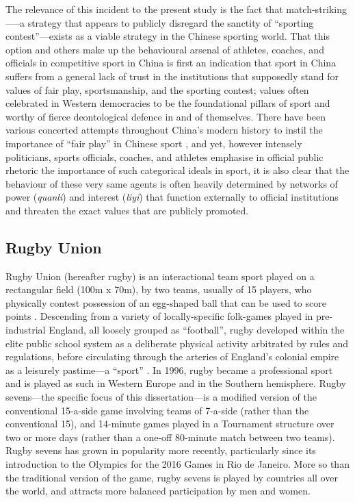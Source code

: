     The relevance of this incident to the present study is the fact that match-striking—--a strategy that appears to publicly disregard the sanctity of ``sporting contest''---exists as a viable strategy in the Chinese sporting world. That this option and others make up the behavioural arsenal of athletes, coaches, and officials in competitive sport in China is first an indication that sport in China suffers from a general lack of trust in the institutions that supposedly stand for values of fair play, sportsmanship, and the sporting contest; values often celebrated in Western democracies to be the foundational pillars of sport and worthy of fierce deontological defence in and of themselves\citep{Morris2004,Gold2002,Yuki2005}.
    There have been various concerted attempts throughout China's modern history to instil the importance of ``fair play'' in Chinese sport \citep{Morris2004,Brownell1995,Brownell2008}, and yet, however intensely politicians, sports officials, coaches, and athletes emphasise in official public rhetoric the importance of such categorical ideals in sport, it is also clear that the behaviour of these very same agents is often heavily determined by networks of power (\textit{quanli}) and interest (\textit{liyi}) that function externally to official institutions and threaten the exact values that are publicly promoted.












  \subsection{Rugby Union}


  Rugby Union (hereafter rugby) is an interactional team sport played on a rectangular field (100m x 70m), by two teams, usually of 15 players, who physically contest possession of an egg-shaped ball that can be used to score points \citep{IRB2014}.  Descending from a variety of locally-specific folk-games played in pre-industrial England, all loosely grouped as ``football'', rugby developed within the elite public school system as a deliberate physical activity arbitrated by rules and regulations, before circulating through the arteries of England's colonial empire as a leisurely pastime—a ``sport'' \citep{Dunning2005}.  In 1996, rugby became a professional sport and is played as such in Western Europe and in the Southern hemisphere. Rugby sevens---the specific focus of this dissertation---is a modified version of the conventional 15-a-side game involving teams of 7-a-side (rather than the conventional 15), and 14-minute games played in a Tournament structure over two or more days (rather than a one-off 80-minute match between two teams).  Rugby sevens has grown in popularity more recently, particularly since its introduction to the Olympics for the 2016 Games in Rio de Janeiro.  More so than the traditional version of the game, rugby sevens is played by countries all over the world, and attracts more balanced participation by men and women.

